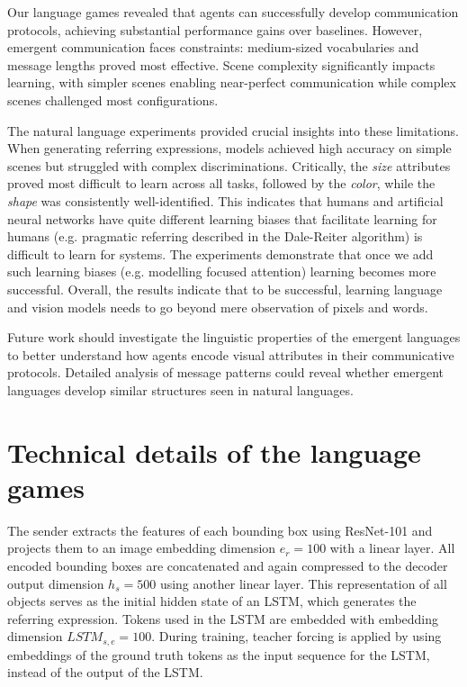 \documentclass[11pt,a4paper]{article}
\begin{document}
Our language games revealed that agents can successfully develop communication protocols, achieving substantial performance gains over baselines.
However, emergent communication faces constraints: medium-sized vocabularies and message lengths proved most effective.
Scene complexity significantly impacts learning, with simpler scenes enabling near-perfect communication while complex scenes challenged most configurations.

The natural language experiments provided crucial insights into these limitations.
When generating referring expressions, models achieved high accuracy on simple scenes but struggled with complex discriminations.
Critically, the \emph{size} attributes proved most difficult to learn across all tasks, followed by the \emph{color}, while the \emph{shape} was consistently well-identified.
This indicates that humans and artificial neural networks have quite different learning biases that facilitate learning for humans (e.g. pragmatic referring described in the Dale-Reiter algorithm) is difficult to learn for systems.
The experiments demonstrate that once we add such learning biases (e.g. modelling focused attention) learning becomes more successful.
Overall, the results indicate that to be successful, learning language and vision models needs to go beyond mere observation of pixels and words.

Future work should investigate the linguistic properties of the emergent languages to better understand how agents encode visual attributes in their communicative protocols.
Detailed analysis of message patterns could reveal whether emergent languages develop similar structures seen in natural languages.




\appendix

\section{Technical details of the language games}
\label{app:technical-details-language-games}
The sender extracts the features of each bounding box using ResNet-101 and projects them to an image embedding dimension $e_r=100$ with a linear layer.
All encoded bounding boxes are concatenated and again compressed to the decoder output dimension $h_s=500$ using another linear layer.
This representation of all objects serves as the initial hidden state of an LSTM, which generates the referring expression.
Tokens used in the LSTM are embedded with embedding dimension $LSTM_{s,e}=100$.
During training, teacher forcing is applied by using embeddings of the ground truth tokens as the input sequence for the LSTM, instead of the output of the LSTM.
\end{document}
